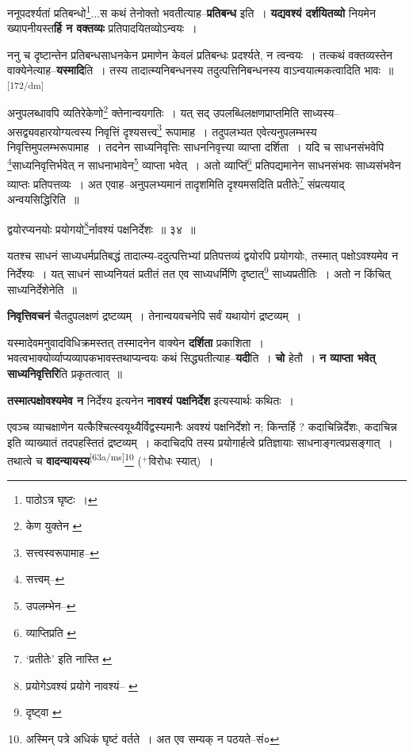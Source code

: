 \documentclass[article,12pt,a4paper]{memoir}
\newcommand{\add}[1]{($^{+}$#1)}
\begin{document}
	  \pstart ननूपदर्श्यतां प्रतिबन्धो\footnote{पाठोऽत्र घृष्टः ।}...स कथं तेनोक्तो भवतीत्याह--\textbf{प्रतिबन्ध} इति । \textbf{यद्यवश्यं दर्शयितव्यो} नियमेन ख्यापनीयस्त\textbf{र्हि न वक्तव्यः} प्रतिपादयितव्योऽन्वयः ।
	\pend
      

	  \pstart ननु च दृष्टान्तेन प्रतिबन्धसाधनकेन प्रमाणेन केवलं प्रतिबन्धः प्रदर्श्यते, न त्वन्वयः । तत्कथं वक्तव्यस्तेन वाक्येनेत्याह--\textbf{यस्मादि}ति । तस्य तादात्म्यनिबन्धनस्य तदुत्पत्तिनिबन्धनस्य वाऽन्वयात्मकत्वादिति भावः ॥
	\pend
      \leavevmode\textsuperscript{\rmlatinfont\tiny [172/dm]}

	  \pstart अनुपलब्धावपि व्यतिरेकेणो\footnote{केण युक्तेन \cite{dp-msB}} क्तेनान्वयगतिः । यत् सद् उपलब्धिलक्षणप्राप्तमिति साध्यस्य--असद्व्यवहारयोग्यत्वस्य निवृत्तिं दृश्यसत्त्व\footnote{सत्त्वस्वरूपामाह--\cite{dp-msC}} रूपामाह । तदुपलभ्यत एवेत्यनुपलम्भस्य निवृत्तिमुपलम्भरूपामाह । तदनेन साध्यनिवृत्तिः साधननिवृत्त्या व्याप्ता दर्शिता । यदि च साधनसंभवेपि \footnote{सत्त्वम्--\cite{dp-msD-n}}साध्यनिवृत्तिर्भवेत् न साधनाभावेन\footnote{उपलम्भेन--\cite{dp-msD-n}} व्याप्ता भवेत् । अतो व्याप्तिं\footnote{व्याप्तिप्रति \cite{dp-msA}} प्रतिपद्यमानेन साधनसंभवः साध्यसंभवेन व्याप्तः प्रतिपत्तव्यः । अत एवाह--अनुपलभ्यमानं तादृशमिति दृश्यमसदिति प्रतीतेः\footnote{‘प्रतीतेः’ इति नास्ति \cite{dp-msA}} संप्रत्ययाद् अन्वयसिद्धिरिति ॥
	\pend
       

	  \pstart द्वयोरप्यनयोः प्रयोगयो\footnote{प्रयोगेऽवश्यं \cite{dp-msB} \cite{dp-edP} \cite{dp-edH} प्रयोगे नावश्यं--\cite{dp-edE} \cite{dp-edN}}र्नावश्यं पक्षनिर्देशः ॥ ३४ ॥
	\pend
       

	  \pstart यतश्च साधनं साध्यधर्मप्रतिबद्धं तादात्म्य-ददुत्पत्तिभ्यां प्रतिपत्तव्यं द्वयोरपि प्रयोगयोः, तस्मात् पक्षोऽवश्यमेव न निर्देश्यः । यत् साधनं साध्यनियतं प्रतीतं तत एव साध्यधर्मिणि दृष्टात्\footnote{दृष्ट्वा \cite{dp-msA} \cite{dp-edP} \cite{dp-edH}} साध्यप्रतीतिः । अतो न किंचित् साध्यनिर्देशेनेति ॥
	\pend
      

	  \pstart \textbf{निवृत्तिवचनं} चैतदुपलक्षणं द्रष्टव्यम् । तेनान्वयवचनेपि सर्वं यथायोगं द्रष्टव्यम् ।
	\pend
      

	  \pstart यस्मादेवमनुवादविधिक्रमस्तत् तस्मादनेन वाक्येन \textbf{दर्शिता} प्रकाशिता । भवत्वभाक्योर्व्याप्यव्यापकभावस्तथाप्यन्वयः कथं सिद्ध्यतीत्याह--\textbf{यदी}ति । \textbf{चो} हेतौ । \textbf{न व्याप्ता भवेत् साध्यनिवृत्तिरि}ति प्रकृतत्वात् ॥
	\pend
      

	  \pstart \textbf{तस्मात्पक्षोवश्यमेव न} निर्देश्य इत्यनेन \textbf{नावश्यं पक्षनिर्देश} इत्यस्यार्थः कथितः ।
	\pend
      

	  \pstart एवञ्च व्याचक्षाणेन यत्कैश्चित्स्वयूथ्यैर्विद्वस्यमानैः अवश्यं पक्षनिर्देशो न; किन्तर्हि ? कदाचिन्निर्देशः, कदाचिन्न इति व्याख्यातं तदपहस्तितं द्रष्टव्यम् । कदाचिदपि तस्य प्रयोगार्हत्वे प्रतिज्ञायाः साधनाङ्गत्वप्रसङ्गात् । तथात्वे च \textbf{वादन्यायस्य}\leavevmode\textsuperscript{\rmlatinfont\tiny [63a/ms]}\footnote{अस्मिन् पत्रे अधिकं घृष्टं वर्तते । अत एव सम्यक् न पठयते--सं०} \add{विरोधः स्यात्} ।
	\pend
      
\end{document}
